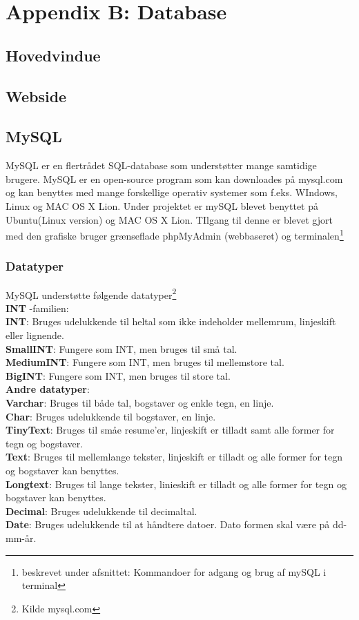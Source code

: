 \chapter*{Appendix B: Database}


\section{Hovedvindue}

\section{Webside}

\section{MySQL}
MySQL er en flertrådet SQL-database som understøtter mange samtidige brugere. MySQL er en open-source program som kan downloades på mysql.com og kan benyttes med mange forskellige operativ systemer som f.eks. WIndows, Linux og MAC OS X Lion.
Under projektet er mySQL blevet benyttet på Ubuntu(Linux version) og MAC OS X Lion. TIlgang til denne er blevet gjort med den grafiske bruger grænseflade phpMyAdmin (webbaseret) og terminalen\footnote{beskrevet under afsnittet: Kommandoer for adgang og brug af mySQL i terminal}

\subsection{Datatyper}
MySQL understøtte følgende datatyper\footnote{Kilde mysql.com} \\
\textbf{INT} -familien:\\
\textbf{INT}: Bruges udelukkende til heltal som ikke indeholder mellemrum, linjeskift eller lignende.\\
\textbf{SmallINT}: Fungere som INT, men bruges til små tal.\\
\textbf{MediumINT}: Fungere som INT, men bruges til mellemstore tal.\\
\textbf{BigINT}: Fungere som INT, men bruges til store tal.\\

\textbf{Andre datatyper}:\\
\textbf{Varchar}: Bruges til både tal, bogstaver og enkle tegn, en linje.\\
\textbf{Char}: Bruges udelukkende til bogstaver, en linje.\\
\textbf{TinyText}: Bruges til småe resume'er, linjeskift er tilladt samt alle former for tegn og bogstaver.\\
\textbf{Text}: Bruges til mellemlange  tekster, linjeskift er tilladt og alle former for tegn og bogstaver kan benyttes.\\
\textbf{Longtext}: Bruges til lange tekster, linieskift er tilladt og alle former for tegn og bogstaver kan benyttes.\\
\textbf{Decimal}: Bruges udelukkende til decimaltal.\\
\textbf{Date}: Bruges udelukkende til at håndtere datoer. Dato formen skal være på dd-mm-år.\\

